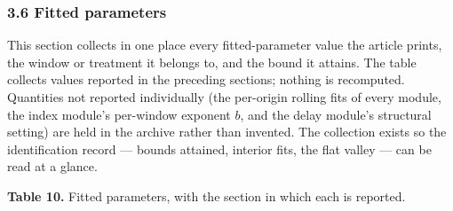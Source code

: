 \documentclass[11pt]{article}
\begin{document}
\subsubsection{3.6 Fitted parameters}\label{fitted-parameters}

This section collects in one place every fitted-parameter value the
article prints, the window or treatment it belongs to, and the bound it
attains. The table collects values reported in the preceding
sections; nothing is recomputed. Quantities not reported individually
(the per-origin rolling fits of every module, the index module's
per-window exponent \(b\), and the delay module's structural setting)
are held in the archive rather than
invented. The collection exists so the identification record --- bounds
attained, interior fits, the flat valley --- can be read at a glance.

\textbf{Table 10.} Fitted parameters, with the section in which each is
reported.
\end{document}
